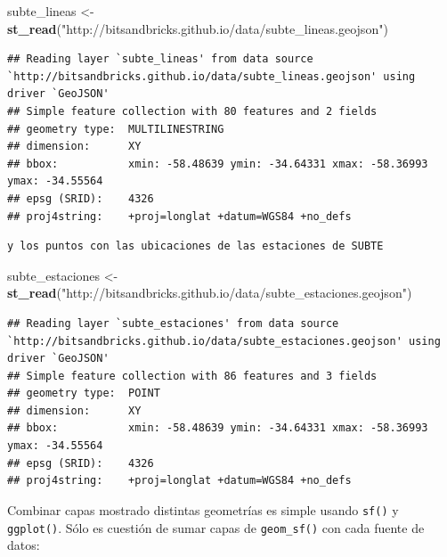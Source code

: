 \documentclass[]{book}
\newenvironment{Shaded}{\begin{snugshade}}{\end{snugshade}}
\newcommand{\KeywordTok}[1]{\textcolor[rgb]{0.13,0.29,0.53}{\textbf{#1}}}
\newcommand{\StringTok}[1]{\textcolor[rgb]{0.31,0.60,0.02}{#1}}
\newcommand{\NormalTok}[1]{#1}
\begin{document}
\begin{Shaded}
\begin{Highlighting}[]
\NormalTok{subte_lineas <-}\StringTok{ }\KeywordTok{st_read}\NormalTok{(}\StringTok{"http://bitsandbricks.github.io/data/subte_lineas.geojson"}\NormalTok{)}
\end{Highlighting}
\end{Shaded}

\begin{verbatim}
## Reading layer `subte_lineas' from data source `http://bitsandbricks.github.io/data/subte_lineas.geojson' using driver `GeoJSON'
## Simple feature collection with 80 features and 2 fields
## geometry type:  MULTILINESTRING
## dimension:      XY
## bbox:           xmin: -58.48639 ymin: -34.64331 xmax: -58.36993 ymax: -34.55564
## epsg (SRID):    4326
## proj4string:    +proj=longlat +datum=WGS84 +no_defs
\end{verbatim}

\begin{verbatim}
y los puntos con las ubicaciones de las estaciones de SUBTE
\end{verbatim}

\begin{Shaded}
\begin{Highlighting}[]
\NormalTok{subte_estaciones <-}\StringTok{ }\KeywordTok{st_read}\NormalTok{(}\StringTok{"http://bitsandbricks.github.io/data/subte_estaciones.geojson"}\NormalTok{)}
\end{Highlighting}
\end{Shaded}

\begin{verbatim}
## Reading layer `subte_estaciones' from data source `http://bitsandbricks.github.io/data/subte_estaciones.geojson' using driver `GeoJSON'
## Simple feature collection with 86 features and 3 fields
## geometry type:  POINT
## dimension:      XY
## bbox:           xmin: -58.48639 ymin: -34.64331 xmax: -58.36993 ymax: -34.55564
## epsg (SRID):    4326
## proj4string:    +proj=longlat +datum=WGS84 +no_defs
\end{verbatim}

Combinar capas mostrado distintas geometrías es simple usando
\texttt{sf()} y \texttt{ggplot()}. Sólo es cuestión de sumar capas de
\texttt{geom\_sf()} con cada fuente de datos:
\end{document}
